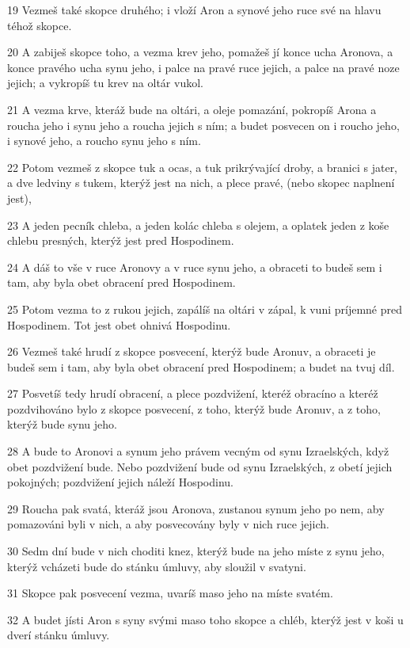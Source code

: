 \par 19 Vezmeš také skopce druhého; i vloží Aron a synové jeho ruce své na hlavu téhož skopce.
\par 20 A zabiješ skopce toho, a vezma krev jeho, pomažeš jí konce ucha Aronova, a konce pravého ucha synu jeho, i palce na pravé ruce jejich, a palce na pravé noze jejich; a vykropíš tu krev na oltár vukol.
\par 21 A vezma krve, kteráž bude na oltári, a oleje pomazání, pokropíš Arona a roucha jeho i synu jeho a roucha jejich s ním; a budet posvecen on i roucho jeho, i synové jeho, a roucho synu jeho s ním.
\par 22 Potom vezmeš z skopce tuk a ocas, a tuk prikrývající droby, a branici s jater, a dve ledviny s tukem, kterýž jest na nich, a plece pravé, (nebo skopec naplnení jest),
\par 23 A jeden pecník chleba, a jeden kolác chleba s olejem, a oplatek jeden z koše chlebu presných, kterýž jest pred Hospodinem.
\par 24 A dáš to vše v ruce Aronovy a v ruce synu jeho, a obraceti to budeš sem i tam, aby byla obet obracení pred Hospodinem.
\par 25 Potom vezma to z rukou jejich, zapálíš na oltári v zápal, k vuni príjemné pred Hospodinem. Tot jest obet ohnivá Hospodinu.
\par 26 Vezmeš také hrudí z skopce posvecení, kterýž bude Aronuv, a obraceti je budeš sem i tam, aby byla obet obracení pred Hospodinem; a budet na tvuj díl.
\par 27 Posvetíš tedy hrudí obracení, a plece pozdvižení, kteréž obracíno a kteréž pozdvihováno bylo z skopce posvecení, z toho, kterýž bude Aronuv, a z toho, kterýž bude synu jeho.
\par 28 A bude to Aronovi a synum jeho právem vecným od synu Izraelských, když obet pozdvižení bude. Nebo pozdvižení bude od synu Izraelských, z obetí jejich pokojných; pozdvižení jejich náleží Hospodinu.
\par 29 Roucha pak svatá, kteráž jsou Aronova, zustanou synum jeho po nem, aby pomazováni byli v nich, a aby posvecovány byly v nich ruce jejich.
\par 30 Sedm dní bude v nich choditi knez, kterýž bude na jeho míste z synu jeho, kterýž vcházeti bude do stánku úmluvy, aby sloužil v svatyni.
\par 31 Skopce pak posvecení vezma, uvaríš maso jeho na míste svatém.
\par 32 A budet jísti Aron s syny svými maso toho skopce a chléb, kterýž jest v koši u dverí stánku úmluvy.
